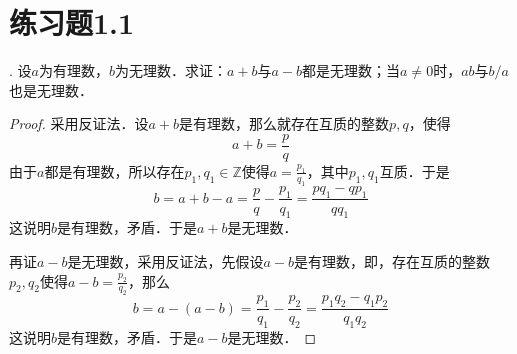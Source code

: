 \documentclass{ctexart}
\theoremstyle{definition}
\theoremstyle{definition}
\theoremstyle{plain}
\theoremstyle{plain}
\theoremstyle{plain}
\theoremstyle{definition}
\begin{document}
\section*{练习题1.1}
. 设$a$为有理数，$b$为无理数．求证：$a+b$与$a-b$都是无理数；当$a\neq 0$时，$ab$与$b/a$也是无理数．
\begin{proof}
采用反证法．设$a+b$是有理数，那么就存在互质的整数$p,q$，使得
\begin{equation}
    a+b = \frac{p}{q}
\end{equation}
由于$a$都是有理数，所以存在$p_1,q_1 \in \mathbb{Z}$使得$a = \displaystyle \frac{p_1}{q_1}$，其中$p_1,q_1$互质．于是
\begin{equation}
    b = a+b - a = \frac{p}{q} - \frac{p_1}{q_1} = \frac{p q_1 - q p_1}{q q_1}
\end{equation}
这说明$b$是有理数，矛盾．于是$a+b$是无理数．

\noindent 再证$a-b$是无理数，采用反证法，先假设$a-b$是有理数，即，存在互质的整数$p_2,q_2$使得$\displaystyle a-b=\frac{p_2}{q_2}$，那么
\begin{equation}
    b = a - (a-b) = \frac{p_1}{q_1} - \frac{p_2}{q_2} = \frac{p_1 q_2 - q_1 p_2}{q_1 q_2}
\end{equation}
这说明$b$是有理数，矛盾．于是$a-b$是无理数．
\end{proof}
\end{document}

